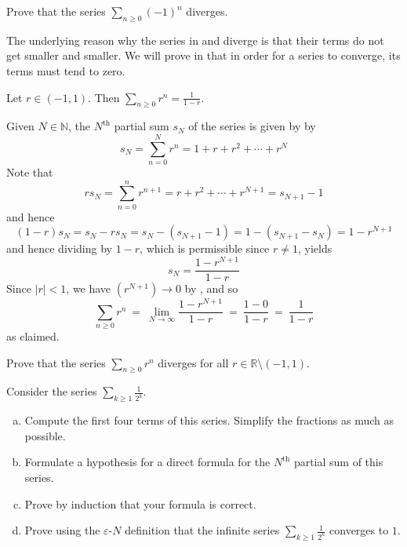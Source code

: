 \begin{exercise}
\label{exAlternatingSeriesOfOneDiverges}
Prove that the series $\sum_{n \ge 0} (-1)^n$ diverges.
\end{exercise}

The underlying reason why the series in  and  diverge is that their terms do not get smaller and smaller. We will prove in  that in order for a series to converge, its terms must tend to zero.

\begin{theorem}
\label{thmGeometricSeries}
Let $r \in (-1, 1)$. Then $\displaystyle\sum_{n \ge 0} r^n = \frac{1}{1-r}$.
\end{theorem}

\begin{cproof}
Given $N \in \mathbb{N}$, the $N^{\text{th}}$ partial sum $s_N$ of the series is given by by
\[ s_N = \sum_{n=0}^N r^n = 1 + r + r^2 + \cdots + r^N \]
Note that
\[ rs_N = \sum_{n=0}^n r^{n+1} = r+r^2+\cdots+r^{N+1} = s_{N+1}-1 \]
and hence
\[ (1-r)s_N = s_N-rs_N = s_N-(s_{N+1}-1) = 1-(s_{N+1}-s_N) = 1-r^{N+1} \]
and hence dividing by $1-r$, which is permissible since $r \ne 1$, yields
\[ s_N = \frac{1-r^{N+1}}{1-r} \]
Since $|r|<1$, we have $(r^{N+1}) \to 0$ by , and so
\[ \sum_{n \ge 0} r^n ~=~ \lim_{N \to \infty} \frac{1-r^{N+1}}{1-r} ~=~ \frac{1-0}{1-r} ~=~ \frac{1}{1-r} \]
as claimed.
\end{cproof}

\begin{exercise}
Prove that the series $\displaystyle \sum_{n \ge 0} r^n$ diverges for all $r \in \mathbb{R} \setminus (-1,1)$.
\end{exercise}

\begin{exercise}
Consider the series $\displaystyle \sum_{k\geq1}^{} \frac{1}{2^k}$.
\begin{enumerate}[(a)]
\item Compute the first four terms of this series. Simplify the fractions as much as possible.
\item Formulate a hypothesis for a direct formula for the $N^{\text{th}}$ partial sum of this series.
\item Prove by induction that your formula is correct.
\item Prove using the $\varepsilon$-$N$ definition that the infinite series $\displaystyle \sum_{k\geq1}^{} \frac{1}{2^k}$ converges to $1$.
\end{enumerate}
\end{exercise}

